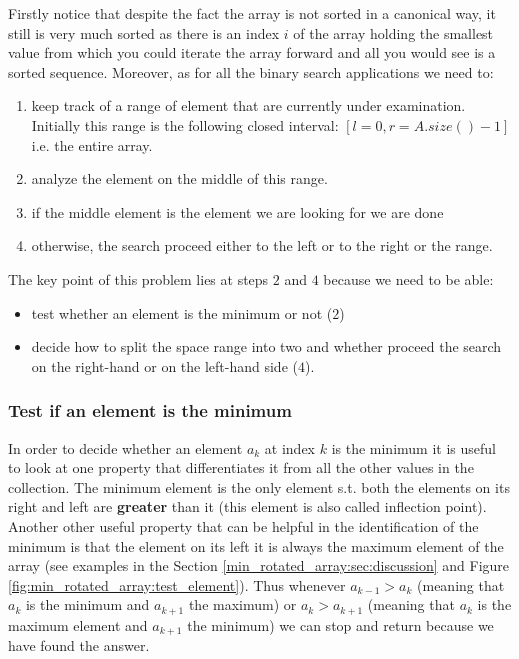 Firstly notice that despite the fact the array is not sorted in a canonical way, it still is very much sorted as there is an index $i$ of the array holding the smallest value from which you could iterate the array forward and all you would see is a sorted sequence.
Moreover, as for all the binary search applications we need to:
\begin{enumerate}
	\item keep track of a range of element that are currently under examination. Initially this range is the following closed interval: $[l=0, r=A.size()-1]$ i.e. the entire array.
	\item analyze the element on the middle of this range.
	\item if the middle element is the element we are looking for we are done
	\item otherwise, the search proceed either to the left or to the right or the range. 
\end{enumerate}

The key point of this problem lies at steps $2$ and $4$ because we need to be able:
\begin{itemize}
	\item test whether an element is the minimum or not ($2$)
	\item decide how to split the space range into two and whether proceed the search on the right-hand or on the left-hand side ($4$).
\end{itemize}

\subsubsection{Test if an element is the minimum}
In order to decide whether an element $a_k$ at index $k$ is the minimum it is useful to look at one property that differentiates it from all the other values in the collection.
The minimum element is the only element s.t. both the elements on its right and left are \textbf{greater} than it (this element is also called inflection point). Another other useful property that can be helpful in the identification of the minimum is that the element on its left it is always the maximum element of the array (see examples in the Section \ref{min_rotated_array:sec:discussion} and Figure \ref{fig:min_rotated_array:test_element}). Thus whenever $a_{k-1} > a_{k}$ (meaning that $a_k$ is the minimum and $a_{k+1}$ the maximum) or $a_{k} > a_{k+1}$ (meaning that $a_k$ is the maximum element and $a_{k+1}$ the minimum) we can stop and return because we have found the answer. 

